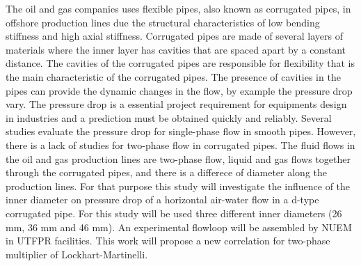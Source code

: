 The oil and gas companies uses flexible pipes, also known as corrugated pipes, in offshore production lines 
due the structural characteristics of low bending stiffness and high axial stiffness.
Corrugated pipes are made of several layers of materials where the inner layer has cavities that are 
spaced apart by a constant distance. The cavities of the corrugated pipes are responsible for flexibility that is the main characteristic of 
the corrugated pipes. The presence of cavities in the pipes can provide the dynamic changes in the flow, by example the pressure drop vary. The pressure drop is a essential project requirement for equipments design in industries and a prediction must
be obtained quickly and reliably. Several studies evaluate the pressure drop for single-phase flow in smooth 
pipes. However, there is a lack of studies for two-phase flow in corrugated pipes. The fluid flows in the oil and gas production lines are two-phase flow, liquid and gas flows together through the corrugated pipes, and there is a differece of diameter along the production lines. For that purpose this study will investigate the influence of the inner diameter on pressure drop of a horizontal air-water flow in a d-type corrugated pipe.
For this study will be used three different inner diameters (26 mm, 36 mm and 46 mm).
An experimental flowloop will be assembled by NUEM in UTFPR facilities. This work will propose a new correlation for 
two-phase multiplier of Lockhart-Martinelli.






